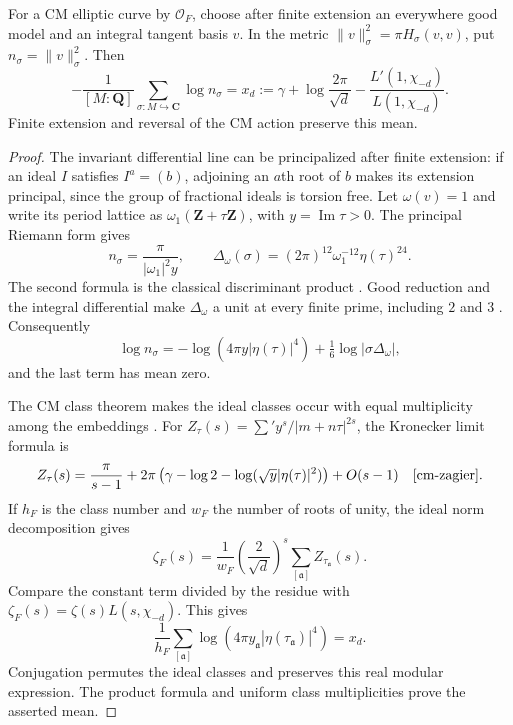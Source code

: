 \begin{lemma}\label{geo-cm-elliptic-period}
For a CM elliptic curve by $\mathcal O_F$, choose after finite
extension an everywhere good model and an integral tangent basis
$v$. In the metric $\|v\|_\sigma^2=\pi H_\sigma(v,v)$, put
$n_\sigma=\|v\|_\sigma^2$. Then
\[
 -\frac1{[M:\mathbf Q]}\sum_{\sigma:M\hookrightarrow\mathbf C}
       \log n_\sigma
 =x_d:=\gamma+\log\frac{2\pi}{\sqrt d}
                  -\frac{L'(1,\chi_{-d})}{L(1,\chi_{-d})}.
\]
Finite extension and reversal of the CM action preserve this mean.
\end{lemma}
\begin{proof}
The invariant differential line can be principalized after finite
extension: if an ideal $I$ satisfies $I^a=(b)$, adjoining an
$a$th root of $b$ makes its extension principal, since the group
of fractional ideals is torsion free. Let $\omega(v)=1$ and write
its period lattice as $\omega_1(\mathbf Z+\tau\mathbf Z)$,
with $y=\operatorname{Im}\tau>0$. The principal Riemann form gives
\[
 n_\sigma=\frac{\pi}{|\omega_1|^2y},\qquad
 \Delta_\omega(\sigma)
   =(2\pi)^{12}\omega_1^{-12}\eta(\tau)^{24}.
\]
The second formula is the classical discriminant product
\cite[Theorem~4.21]{cm-milne-mf}.
Good reduction and the integral differential make
$\Delta_\omega$ a unit at every finite prime, including $2$ and $3$
\cite[Example~5.3]{cm-conrad-minimal}.
Consequently
\[
 \log n_\sigma
   =-\log(4\pi y|\eta(\tau)|^4)
                         +\tfrac16\log|\sigma\Delta_\omega|,
\]
and the last term has mean zero.

The CM class theorem makes the ideal classes occur with equal
multiplicity among the embeddings
\cite[Theorem~12.18]{cm-milne-mf}.
For
$Z_\tau(s)=\sum' y^s/|m+n\tau|^{2s}$, the Kronecker limit formula is
\[
 Z_\tau(s)=\frac{\pi}{s-1}
       +2\pi\left(\gamma-\log2
                    -\log(\sqrt y|\eta(\tau)|^2)\right)+O(s-1)
 \quad\cite[\S2]{cm-zagier}.
\]
If $h_F$ is the class number and $w_F$ the number of roots of unity,
the ideal norm decomposition gives
\[
 \zeta_F(s)=\frac1{w_F}\left(\frac2{\sqrt d}\right)^s
                       \sum_{[\mathfrak a]}Z_{\tau_{\mathfrak a}}(s).
\]
Compare the constant term divided by the residue with
$\zeta_F(s)=\zeta(s)L(s,\chi_{-d})$. This gives
\[
 \frac1{h_F}\sum_{[\mathfrak a]}
       \log(4\pi y_{\mathfrak a}|\eta(\tau_{\mathfrak a})|^4)=x_d.
\]
Conjugation permutes the ideal classes and preserves this real
modular expression. The product formula and uniform class
multiplicities prove the asserted mean.
\end{proof}

